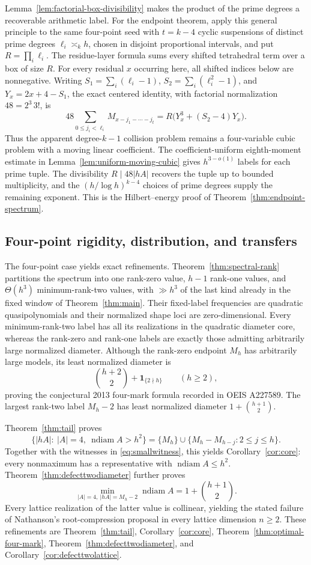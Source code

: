 \documentclass[11pt,reqno]{amsart}
\theoremstyle{definition}
\theoremstyle{remark}
\newcommand{\ndiam}{\operatorname{ndiam}}
\begin{document}
Lemma~\ref{lem:factorial-box-divisibility} makes the product of the prime
degrees a recoverable arithmetic label.  For the endpoint theorem, apply this
general principle to the same four-point seed with $t=k-4$ cyclic suspensions of
distinct prime degrees
$\ell_i\asymp_k h$, chosen in disjoint proportional intervals, and put
$R=\prod_i\ell_i$.  The residue-layer formula sums every shifted
tetrahedral term over a box of size $R$.  For every residual $x$ occurring
here, all shifted indices below are nonnegative.  Writing
$S_1=\sum_i(\ell_i-1)$, $S_2=\sum_i(\ell_i^2-1)$, and
$Y_x=2x+4-S_1$, the exact centered identity, with factorial normalization
$48=2^3\,3!$, is
\[
 48\sum_{0\leq j_i<\ell_i}M_{x-j_1-\cdots-j_t}
 =R\bigl(Y_x^3+(S_2-4)Y_x\bigr).
\]
Thus the apparent degree-$k-1$ collision problem remains a four-variable
cubic problem with a moving linear coefficient.  The coefficient-uniform
eighth-moment estimate in Lemma~\ref{lem:uniform-moving-cubic} gives
$h^{3-o(1)}$ labels for each prime tuple.  The
divisibility $R\mid48|hA|$ recovers the tuple up to bounded multiplicity, and
the $(h/\log h)^{k-4}$ choices of prime degrees supply the remaining
exponent.  This is the Hilbert--energy proof of
Theorem~\ref{thm:endpoint-spectrum}.

\subsection*{Four-point rigidity, distribution, and transfers}

The four-point case yields exact refinements.  Theorem~\ref{thm:spectral-rank}
partitions the spectrum into one rank-zero value, $h-1$ rank-one values, and
$\Theta(h^3)$ minimum-rank-two values, with $\gg h^3$ of the last kind already
in the fixed window of Theorem~\ref{thm:main}.  Their fixed-label frequencies
are quadratic quasipolynomials and their normalized shape loci are
zero-dimensional.  Every minimum-rank-two label has all its realizations in
the quadratic diameter core, whereas the rank-zero and rank-one labels are
exactly those admitting arbitrarily large normalized diameter.  Although the
rank-zero endpoint $M_h$ has arbitrarily large models, its least normalized
diameter is
\[
 \binom{h+2}{2}+\mathbf 1_{\{2\nmid h\}}
 \qquad(h\geq2),
\]
proving the conjectural 2013 four-mark formula recorded in OEIS A227589.  The largest
rank-two label $M_h-2$ has least normalized diameter
$1+\binom{h+1}{2}$.

Theorem~\ref{thm:tail} proves
\[
 \{|hA|:\ |A|=4,\ \ndiam A>h^2\}
 =\{M_h\}\cup\{M_h-M_{h-j}:2\leq j\leq h\}.
\]
Together with the witnesses in \eqref{eq:smallwitness}, this yields
Corollary~\ref{cor:core}: every nonmaximum has a representative with
$\ndiam A\leq h^2$.
Theorem~\ref{thm:defecttwodiameter} further proves
\[
 \min_{|A|=4,\ |hA|=M_h-2}\ndiam A
 =1+\binom{h+1}{2}.
\]
Every lattice realization of the latter value is collinear, yielding the
stated failure of Nathanson's root-compression proposal in every lattice
dimension $n\geq2$.  These refinements are Theorem~\ref{thm:tail},
Corollary~\ref{cor:core}, Theorem~\ref{thm:optimal-four-mark},
Theorem~\ref{thm:defecttwodiameter}, and Corollary~\ref{cor:defecttwolattice}.
\end{document}
